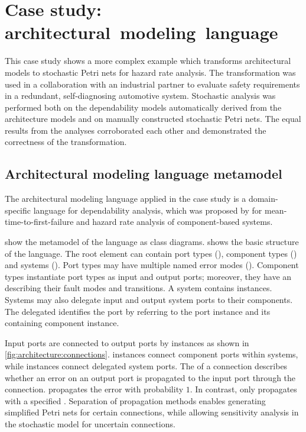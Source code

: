 \chapter{Case study: architectural~modeling~language}
\label{app:architecture}

This case study shows a more complex example which transforms architectural models to stochastic Petri nets for hazard rate analysis. The transformation was used in a collaboration with an industrial partner to evaluate safety requirements in a redundant, self-diagnosing automotive system. Stochastic analysis was performed both on the dependability models automatically derived from the architecture models and on manually constructed stochastic Petri nets. The equal results from the analyses corroborated each other and demonstrated the correctness of the transformation.

\section{Architectural modeling language metamodel}

The architectural modeling language applied in the case study is a domain-specific language for dependability analysis, which was proposed by \citet{Ecsedi16architecture} for mean-time-to-first-failure and hazard rate analysis of component-based systems.

 show the metamodel of the language as class diagrams.  shows the basic structure of the language. The root element  can contain port types (), component types () and systems (). Port types may have multiple named error modes (). Component types instantiate port types as input and output ports; moreover, they have an  describing their fault modes and transitions. A system contains  instances. Systems may also delegate input and output system ports to their components. The delegated  identifies the port by referring to the port instance and its containing component instance.

Input ports are connected to output ports by  instances as shown in \vref{fig:architecture:connections}.  instances connect component ports within systems, while  instances connect delegated system ports. The  of a connection describes whether an error on an output port is propagated to the input port through the connection.  propagates the error with probability \(1\). In contrast,  only propagates with a specified . Separation of propagation methods enables generating simplified Petri nets for certain connections, while allowing sensitivity analysis in the stochastic model for uncertain connections. 

